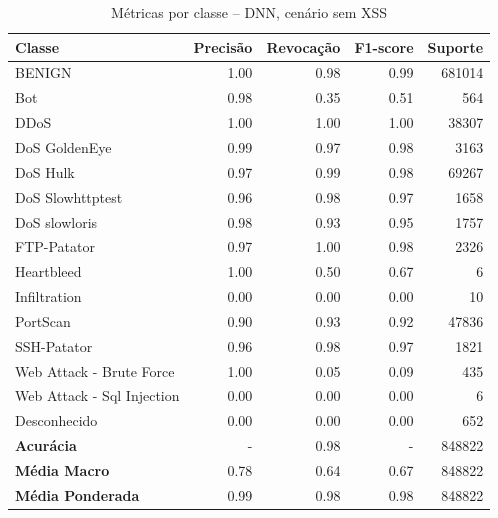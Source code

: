 \begin{table}[H]
    \centering
    \small
    \begin{tabular}{lrrrr}
        \hline
        Classe                     & Precisão & Revocação & F1-score & Suporte \\
        \hline
        BENIGN                     & 1.00     & 0.98      & 0.99     & 681014  \\
        Bot                        & 0.98     & 0.35      & 0.51     & 564     \\
        DDoS                       & 1.00     & 1.00      & 1.00     & 38307   \\
        DoS GoldenEye              & 0.99     & 0.97      & 0.98     & 3163    \\
        DoS Hulk                   & 0.97     & 0.99      & 0.98     & 69267   \\
        DoS Slowhttptest           & 0.96     & 0.98      & 0.97     & 1658    \\
        DoS slowloris              & 0.98     & 0.93      & 0.95     & 1757    \\
        FTP-Patator                & 0.97     & 1.00      & 0.98     & 2326    \\
        Heartbleed                 & 1.00     & 0.50      & 0.67     & 6       \\
        Infiltration               & 0.00     & 0.00      & 0.00     & 10      \\
        PortScan                   & 0.90     & 0.93      & 0.92     & 47836   \\
        SSH-Patator                & 0.96     & 0.98      & 0.97     & 1821    \\
        Web Attack - Brute Force   & 1.00     & 0.05      & 0.09     & 435     \\
        Web Attack - Sql Injection & 0.00     & 0.00      & 0.00     & 6       \\
        Desconhecido               & 0.00     & 0.00      & 0.00     & 652     \\
        \hline
        \textbf{Acurácia}          & -        & 0.98      & -        & 848822  \\
        \textbf{Média Macro}       & 0.78     & 0.64      & 0.67     & 848822  \\
        \textbf{Média Ponderada}   & 0.99     & 0.98      & 0.98     & 848822  \\
        \hline
    \end{tabular}
    \caption{Métricas por classe -- DNN, cenário sem XSS}
    \label{table:dnn_Sem_XSS_metricas}
\end{table}